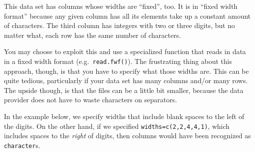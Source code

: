 \documentclass[12pt,krantz2]{krantz}
\makeatletter
\newenvironment{Shaded}{\begin{snugshade}}{\end{snugshade}}
\newcommand{\CommentTok}[1]{\textcolor[rgb]{0.37,0.37,0.37}{\textit{#1}}}
\newcommand{\DataTypeTok}[1]{\textcolor[rgb]{0.27,0.27,0.27}{#1}}
\newcommand{\DecValTok}[1]{\textcolor[rgb]{0.06,0.06,0.06}{#1}}
\newcommand{\KeywordTok}[1]{\textcolor[rgb]{0.27,0.27,0.27}{\textbf{#1}}}
\newcommand{\NormalTok}[1]{#1}
\newcommand{\StringTok}[1]{\textcolor[rgb]{0.5,0.5,0.5}{#1}}
\newenvironment{kframe}{%
\medskip{}
\setlength{\fboxsep}{.8em}
 \def\at@end@of@kframe{}%
 \ifinner\ifhmode%
  \def\at@end@of@kframe{\end{minipage}}%
  \begin{minipage}{\columnwidth}%
 \fi\fi%
 \def\FrameCommand##1{\hskip\@totalleftmargin \hskip-\fboxsep
 \colorbox{shadecolor}{##1}\hskip-\fboxsep
     \hskip-\linewidth \hskip-\@totalleftmargin \hskip\columnwidth}%
 \MakeFramed {\advance\hsize-\width
   \@totalleftmargin\z@ \linewidth\hsize
   \@setminipage}}%
 {\par\unskip\endMakeFramed%
 \at@end@of@kframe}
\renewenvironment{Shaded}{\begin{kframe}}{\end{kframe}}
\makeatother
\begin{document}
\begin{Shaded}
\end{Shaded}

This data set has columns whose widths are ``fixed'', too. It is in ``fixed width format'' because any given column has all its elements take up a constant amount of characters. The third column has integers with two or three digits, but no matter what, each row has the same number of characters.

You may choose to exploit this and use a specialized function that reads in data in a fixed width format (e.g.~\texttt{read.fwf()}). The frustrating thing about this approach, though, is that you have to specify what those widths are. This can be quite tedious, particularly if your data set has many columns and/or many rows. The upside though, is that the files can be a little bit smaller, because the data provider does not have to waste characters on separators.

In the example below, we specify widths that include blank spaces to the left of the digits. On the other hand, if we specified \texttt{widths=c(2,2,4,4,1)}, which includes spaces to the \emph{right} of digits, then columns would have been recognized as \texttt{character}s.

\begin{Shaded}
\end{Shaded}
\end{document}
